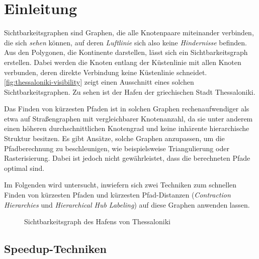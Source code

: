 \chapter{Einleitung}

Sichtbarkeitsgraphen sind Graphen, die alle Knotenpaare miteinander verbinden, die sich \emph{sehen} können, auf deren \emph{Luftlinie} sich also keine \emph{Hindernisse} befinden.
Aus den Polygonen, die Kontinente darstellen, lässt sich ein Sichtbarkeitsgraph erstellen.
Dabei werden die Knoten entlang der Küstenlinie mit allen Knoten verbunden, deren direkte Verbindung keine Küstenlinie schneidet.
\autoref{fig:thessaloniki-visibility} zeigt einen Ausschnitt eines solchen Sichtbarkeitsgraphen.
Zu sehen ist der Hafen der griechischen Stadt Thessaloniki.

Das Finden von kürzesten Pfaden ist in solchen Graphen rechenaufwendiger als etwa auf Straßengraphen mit vergleichbarer Knotenanzahl, da sie unter anderem einen höheren durchschnittlichen Knotengrad und keine inhärente hierarchische Struktur besitzen.
Es gibt Ansätze, solche Graphen anzupassen, um die Pfadberechnung zu beschleunigen, wie beispielsweise Triangulierung oder Rasterisierung.
Dabei ist jedoch nicht gewährleistet, dass die berechneten Pfade optimal sind.

Im Folgenden wird untersucht, inwiefern sich zwei Techniken zum schnellen Finden von kürzesten Pfaden und kürzesten Pfad-Distanzen (\emph{Contraction Hierarchies} und \emph{Hierarchical Hub Labeling}) auf diese Graphen anwenden lassen.

\begin{figure}[ht]%
  \centering
  \caption{Sichtbarkeitsgraph des Hafens von Thessaloniki}%
  \label{fig:thessaloniki-visibility}%
\end{figure}


\section{Speedup-Techniken}

